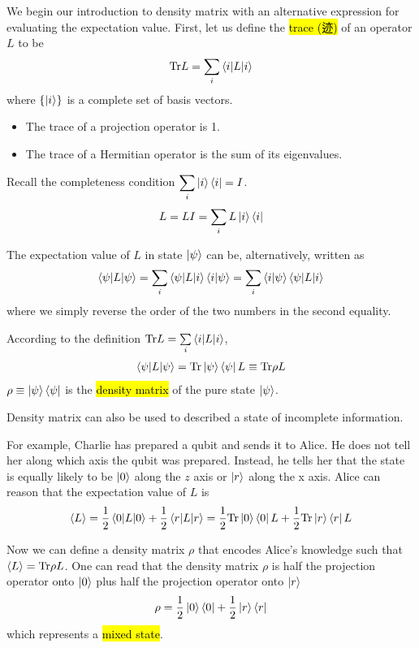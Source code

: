 We begin our introduction to density matrix with an alternative expression for evaluating the expectation value. First, let us define the \hl{trace (迹)} of an operator $L$ to be
\begin{align*}
    \mathrm{Tr}L=\sum_i \braket{i|L|i}
\end{align*}
where $\left\{ \ket{i} \right\}$ is a complete set of basis vectors. 
\begin{itemize}
    \item The trace of a projection operator is 1. 
    \item The trace of a Hermitian operator is the sum of its eigenvalues. 
\end{itemize}

Recall the completeness condition $\displaystyle \sum_i \ket{i}\bra{i}=I$. 
\begin{align*}
    L=LI=\sum_i L\ket{i}\bra{i}
\end{align*}

The expectation value of $L$ in state $\ket{\psi}$ can be, alternatively, written as 
\begin{align*}
    \braket{\psi|L|\psi}=\sum_i \braket{\psi|L|i}\braket{i|\psi}=\sum_i \braket{i|\psi}\braket{\psi|L|i}
\end{align*}
where we simply reverse the order of the two numbers in the second equality.

According to the definition $ \mathrm{Tr}L=\sum\limits_i \braket{i|L|i}$, 
\begin{align*}
    \braket{\psi|L|\psi}=\mathrm{Tr}\ket{\psi}\bra{\psi}L\equiv\mathrm{Tr} \rho L
\end{align*}
$\rho\equiv \ket{\psi}\bra{\psi}$ is the \hl{density matrix} of the pure state $\ket{\psi}$. 

Density matrix can also be used to described a state of incomplete information. 

For example, Charlie has prepared a qubit and sends it to Alice. He does not tell her along which axis the qubit was prepared. Instead, he tells her that the state is equally likely to be $\ket{0}$ along the $z$ axis or $\ket{r}$ along the x axis. Alice can reason that the expectation value of $L$ is
\begin{align*}
    \braket{L}=\frac{1}{2}\braket{0|L|0}+\frac{1}{2}\braket{r|L|r}=\frac{1}{2}\mathrm{Tr}\ket{0}\bra{0}L + \frac{1}{2}\mathrm{Tr}\ket{r}\bra{r}L
\end{align*}

Now we can define a density matrix $\rho$ that encodes Alice’s knowledge such that $\braket{L}=\mathrm{Tr}\rho L$. 
One can read that the density matrix $\rho$ is half the projection operator onto $\ket{0}$ plus half the projection operator onto $\ket{r}$
\begin{align*}
    \rho=\frac{1}{2}\ket{0}\bra{0}+\frac{1}{2}\ket{r}\bra{r}
\end{align*}
which represents a \hl{mixed state}.


